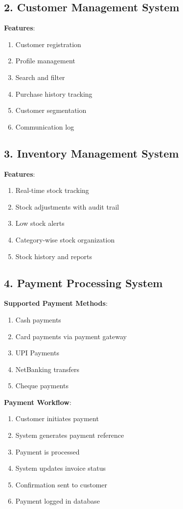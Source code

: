 \documentclass[12pt,a4paper]{report}
\begin{document}
\subsection{2. Customer Management System}

\textbf{Features}:
\begin{enumerate}[label=\roman*)]
    \item Customer registration
    \item Profile management
    \item Search and filter
    \item Purchase history tracking
    \item Customer segmentation
    \item Communication log
\end{enumerate}

\subsection{3. Inventory Management System}

\textbf{Features}:
\begin{enumerate}[label=\roman*)]
    \item Real-time stock tracking
    \item Stock adjustments with audit trail
    \item Low stock alerts
    \item Category-wise stock organization
    \item Stock history and reports
\end{enumerate}

\subsection{4. Payment Processing System}

\textbf{Supported Payment Methods}:
\begin{enumerate}[label=\roman*)]
    \item Cash payments
    \item Card payments via payment gateway
    \item UPI Payments
    \item NetBanking transfers
    \item Cheque payments
\end{enumerate}

\textbf{Payment Workflow}:
\begin{enumerate}[label=\roman*)]
    \item Customer initiates payment
    \item System generates payment reference
    \item Payment is processed
    \item System updates invoice status
    \item Confirmation sent to customer
    \item Payment logged in database
\end{enumerate}
\end{document}
